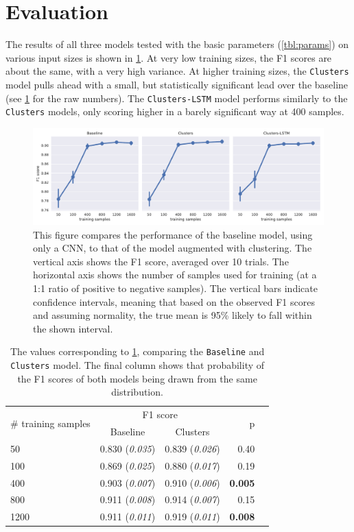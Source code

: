 \section{Evaluation}
\FloatBarrier%
The results of all three models tested with the basic parameters
(\cref{tbl:params}) on various input sizes is shown in \cref{fig:result}. At
very low training sizes, the F1 scores are about the same, with a very high
variance. At higher training sizes, the \texttt{Clusters} model pulls ahead with
a small, but statistically significant lead over the baseline
(see \cref{tbl:base_cl} for the raw numbers). The \texttt{Clusters-LSTM} model
performs similarly to the \texttt{Clusters} models, only scoring higher in a
barely significant way at 400 samples. 

\begin{figure}[tb]
  \centering
  \includegraphics[width=\textwidth]{figures/results/main/factorplot_f1.pdf}
  \caption{This figure compares the performance of the baseline model, using
    only a CNN, to that of the model augmented with clustering. The vertical axis
    shows the F1 score, averaged over 10 trials. The horizontal axis shows the
    number of samples used for training (at a 1:1 ratio of positive to negative
    samples). The vertical bars indicate confidence intervals, meaning that based on
    the observed F1 scores and assuming normality, the true mean is 95\% likely to
  fall within the shown interval.\label{fig:result}}
\end{figure}
\begin{table}[tb]
  \centering
  \begin{tabular}{lrrrr}
    \toprule
    \multirow{2}[3]{*}{\# training samples} & \multicolumn{2}{c}{F1 score} & \multirow{2}[3]{*}{p} \\
    \cmidrule(lr){2-3}
    & \multicolumn{1}{c}{Baseline} & \multicolumn{1}{c}{Clusters} & \\
    \midrule
    50   & 0.830 (\emph{0.035}) & 0.839 (\emph{0.026}) & 0.40 \\
    100  & 0.869 (\emph{0.025}) & 0.880 (\emph{0.017}) & 0.19 \\
    400  & 0.903 (\emph{0.007}) & 0.910 (\emph{0.006}) & \textbf{0.005} \\
    800  & 0.911 (\emph{0.008}) & 0.914 (\emph{0.007}) & 0.15 \\
    1200 & 0.911 (\emph{0.011}) & 0.919 (\emph{0.011}) & \textbf{0.008} \\
    \bottomrule
  \end{tabular}
  \caption{The values corresponding to \cref{fig:result}, comparing the
    \texttt{Baseline} and \texttt{Clusters} model. The final column shows
    that probability of the F1 scores of both models being drawn from the same
  distribution.\label{tbl:base_cl}}
\end{table}
